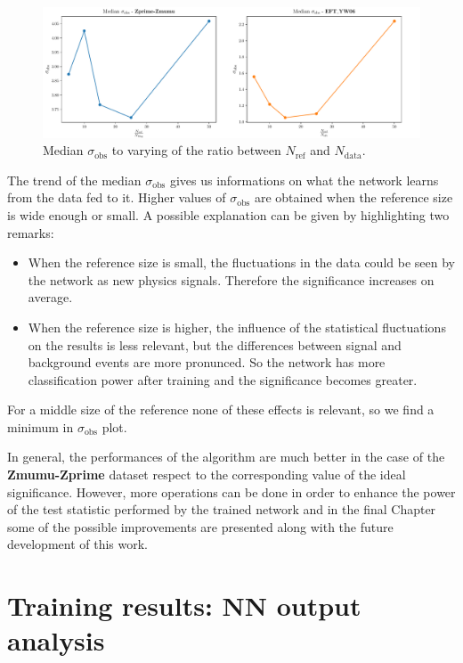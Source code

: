\vspace{-5mm}
\begin{figure}[H]
	\centering
	\includegraphics[width=1.0\textwidth]{Python/RESULTS/MED_SIG/med_sig_plot.pdf}
	\caption{Median $\sigma_\mathrm{obs}$ to varying of the ratio between $N_\mathrm{ref}$ and $N_\mathrm{data}$.}
	\label{fig:MED_SIG_CURVE}
\end{figure}

The trend of the median $\sigma_\mathrm{obs}$ gives us informations on what the network learns from the data fed to it. Higher values of $\sigma_\mathrm{obs}$ are obtained when the reference size is wide enough or small. A possible explanation can be given by highlighting two remarks:
\begin{itemize}
	\item When the reference size is small, the fluctuations in the data could be seen by the network as new physics signals. Therefore the significance increases on average.
	\item When the reference size is higher, the influence of the statistical fluctuations on the results is less relevant, but the differences between signal and background events are more pronunced. So the network has more classification power after training and the significance becomes greater.
\end{itemize}
For a middle size of the reference none of these effects is relevant, so we find a minimum in $\sigma_\mathrm{obs}$ plot.

In general, the performances of the algorithm are much better in the case of the \textbf{Zmumu-Zprime} dataset respect to the corresponding value of the ideal significance. However, more operations can be done in order to enhance the power of the test statistic performed by the trained network and in the final Chapter some of the possible improvements are presented along with the future development of this work.





\section{Training results: NN output analysis}

